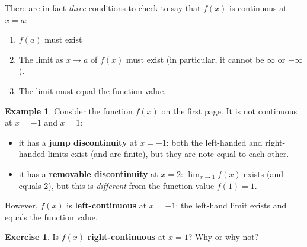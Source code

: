 \documentclass[11pt,reqno,final]{amsart}
\numberwithin{equation}{section}
\numberwithin{figure}{section}
\theoremstyle{definition} %
\newtheorem{example}[equation]{Example}%
\newtheorem{exercise}[question]{Exercise}
\begin{document}
There are in fact \textit{three} conditions to check to say that $f(x)$ is continuous at $x=a$:
\begin{enumerate}[(1)]
\item $f(a)$ must exist
\item The limit as $x \to a$ of $f(x)$ must exist (in particular, it cannot be $\infty$ or $-\infty$).
\item The limit must equal the function value.
\end{enumerate}

\newpage

\begin{example}
        Consider the function $f(x)$ on the first page. It is not continuous at $x=-1$ and $x=1$:
        \begin{itemize}
        \item it has a \textbf{jump discontinuity} at $x=-1$: both the left-handed and right-handed limits exist (and are finite), but they are note equal to each other.
        \item it has a \textbf{removable discontinuity} at $x=2$: $\lim_{x \to 1} f(x)$ exists (and equals 2), but this is \textit{different} from the function value $f(1) = 1$.
        \end{itemize}
        However, $f(x)$ is \textbf{left-continuous} at $x=-1$: the left-hand limit exists and equals the function value.
\end{example}

\begin{exercise}
        Is $f(x)$ \textbf{right-continuous} at $x=1$? Why or why not?
        \vfill
\end{exercise}
\end{document}
